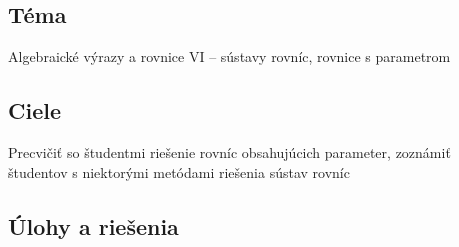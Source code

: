 
\subsection*{Téma}
Algebraické výrazy a rovnice VI -- sústavy rovníc, rovnice s parametrom

\subsection*{Ciele}

Precvičiť so študentmi riešenie rovníc obsahujúcich parameter, zoznámiť študentov s niektorými metódami riešenia sústav rovníc

\subsection*{Úlohy a riešenia} 












%

%